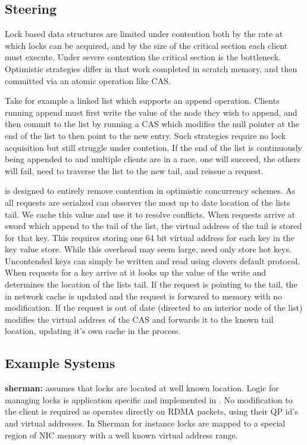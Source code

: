 \subsection{Steering}

Lock based data structures are limited under contention both
by the rate at which locks can be acquired, and by the size
of the critical section each client must execute. Under
severe contention the critical section is the bottleneck.
Optimistic strategies differ in that work completed in
scratch memory, and then committed via an atomic operation
like CAS. 

Take for example a linked list which supports an append
operation. Clients running append must first write the
value of the node they wish to append, and then commit to
the list by running a CAS which modifies the null pointer at
the end of the list to then point to the new entry. Such
strategies require no lock acquisition but still struggle
under contetion. If the end of the list is continuously
being appended to and multiple clients are in a race, one
will succeed, the others will fail, need to traverse the
list to the new tail, and reissue a request. 

{\sword} is designed to entirely remove contention in
optimistic concurrency schemes. As all requests are
serialzed {\sword} can observer the most up to date location
of the lists tail. We cache this value and use it to resolve
conflicts. When requests arrive at sword which append to the
tail of the list, the virtual address of the tail is stored
for that key. This requires storing one 64 bit virtual
address for each key in the key value store. While this
overhead may seem large, {\sword} need only store hot keys.
Uncontended keys can simply be written and read using
clovers default protocol. When requests for a key arrive at
{\sword} it looks up the value of the write and determines the
location of the lists tail. If the request is pointing to
the tail, the in network cache is updated and the request is
forwared to memory with no modification. If the request is
out of date (directed to an interior node of the list)
{\sword} modifies the virtual address of the CAS and forwards
it to the known tail location, updating it's own cache in
the process.


\subsection{Example Systems}

\textbf{sherman:} {{\sword}} assumes that locks are located at well known
location. Logic for managing locks is application specific
and implemented in {\sword}. No modification to the client is
required as {\sword} operates directly on RDMA packets, using
their QP id's and virtual addresses. In Sherman for instance
locks are mapped to a special region of NIC memory with a
well known virtual address range.

